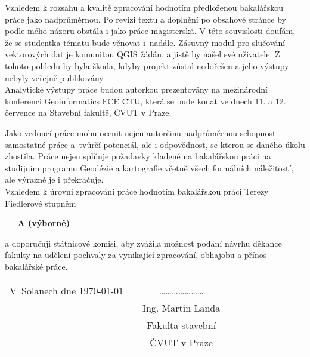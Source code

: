 \documentclass[czech,11pt,a4paper]{article}
\begin{document}
Vzhledem k rozsahu a kvalitě zpracování hodnotím předloženou
bakalářskou práce jako nadprůměrnou. Po revizi textu a doplnění po
obsahové stránce by podle mého názoru obstála i jako práce
magisterská. V této souvislosti doufám, že se studentka tématu bude
věnovat i~nadále. Zásuvný modul pro slučování vektorových dat je
komunitou QGIS žádán, a jistě by našel své uživatele. Z tohoto pohledu
by byla škoda, kdyby projekt zůstal nedořešen a jeho výstupy nebyly
veřejně publikovány.
\\

Analytické výstupy práce budou autorkou prezentovány na mezinárodní
konferenci Geoinformatics FCE CTU, která se bude konat ve dnech 11. a
12. července na Stavební fakultě, ČVUT v Praze.
\\

\newpage

Jako vedoucí práce mohu ocenit nejen autorčinu nadprůměrnou schopnost
samostatné práce a~tvůrčí potenciál, ale i odpovědnost, se kterou se
daného úkolu zhostila. Práce nejen splňuje požadavky kladené na
bakalářskou práci na studijním programu Geodézie a kartografie včetně
všech formálních náležitostí, ale výrazně je i překračuje. \\

Vzhledem k úrovni zpracování práce hodnotím bakalářskou práci Terezy
Fiedlerové stupněm

\begin{center}
{\bf --- A (výborně)  ---}
\end{center}

a doporučuji státnicové komisi, aby zvážila možnost podání návrhu
děkance fakulty na udělení pochvaly za vynikající zpracování, obhajobu
a přínos bakalářské práce.

\vspace{2cm}

\begin{tabular}{lp{}c}
V~Solanech dne \today & & \ldots\ldots\ldots\ldots\ldots\ldots\ldots \\
& & Ing. Martin Landa \\
& & Fakulta stavební \\
& & ČVUT v Praze \\
\end{tabular}
\end{document}
